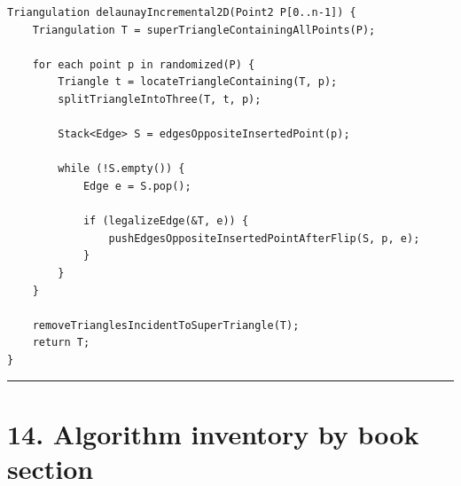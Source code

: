 \documentclass[11pt]{article}
\begin{document}
\begin{verbatim}
Triangulation delaunayIncremental2D(Point2 P[0..n-1]) {
    Triangulation T = superTriangleContainingAllPoints(P);

    for each point p in randomized(P) {
        Triangle t = locateTriangleContaining(T, p);
        splitTriangleIntoThree(T, t, p);

        Stack<Edge> S = edgesOppositeInsertedPoint(p);

        while (!S.empty()) {
            Edge e = S.pop();

            if (legalizeEdge(&T, e)) {
                pushEdgesOppositeInsertedPointAfterFlip(S, p, e);
            }
        }
    }

    removeTrianglesIncidentToSuperTriangle(T);
    return T;
}
\end{verbatim}

\begin{center}\rule{0.5\linewidth}{0.5pt}\end{center}

\section{14. Algorithm inventory by book
section}\label{algorithm-inventory-by-book-section}
\end{document}
